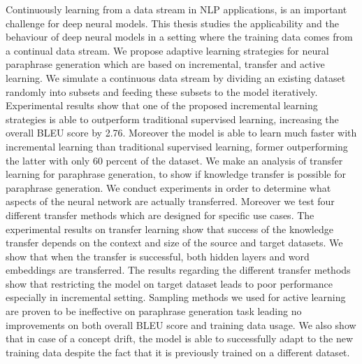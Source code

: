 \documentclass[12pt,final,twoside]{report}
\theoremstyle{plain}
\theoremstyle{definition}
\theoremstyle{remark}
\begin{document}
Continuously learning from a data stream in NLP applications, is an important challenge for deep neural models. This thesis studies the applicability and the behaviour of deep neural models in a setting where the training data comes from a continual data stream. We propose adaptive learning strategies for neural paraphrase generation which are based on incremental, transfer and active learning. We simulate a continuous data stream by dividing an existing dataset randomly into subsets and feeding these subsets to the model iteratively. Experimental results show that one of the proposed incremental learning strategies is able to outperform traditional supervised learning, increasing the overall BLEU score by 2.76. Moreover the model is able to learn much faster with incremental learning than traditional supervised learning, former outperforming the latter with only 60 percent of the dataset. We make an analysis of transfer learning for paraphrase generation, to show if knowledge transfer is possible for paraphrase generation. We conduct experiments in order to determine what aspects of the neural network are actually transferred. Moreover we test four different transfer methods which are designed for specific use cases. The experimental results on transfer learning show that success of the knowledge transfer depends on the context and size of the source and target datasets. We show that when the transfer is successful, both hidden layers and word embeddings are transferred. The results regarding the different transfer methods show that restricting the model on target dataset leads to poor performance especially in incremental setting. Sampling methods we used for active learning are proven to be ineffective on paraphrase generation task leading no improvements on both overall BLEU score and training data usage. We also show that in case of a concept drift, the model is able to successfully adapt to the new training data despite the fact that it is previously trained on a different dataset.


	


\end{document}
